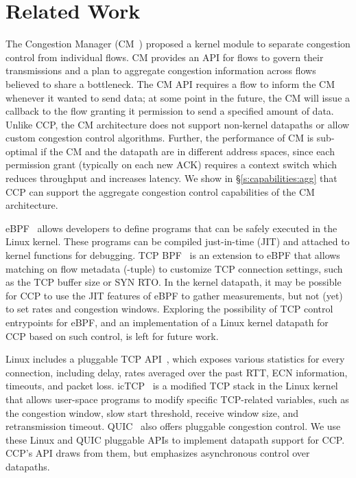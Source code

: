 \section{Related Work}
\label{s:relwork}
The Congestion Manager (CM~\cite{cm}) proposed a kernel module to separate congestion control from individual flows. CM provides an API for flows to govern their transmissions and a plan to aggregate congestion information across flows believed to share a bottleneck. The CM API requires a flow to inform the CM whenever it wanted to send data; at some point in the future, the CM will issue a callback to the flow granting it permission to send a specified amount of data. Unlike CCP, the CM architecture does not support non-kernel datapaths or allow custom congestion control algorithms. Further, the performance of CM is sub-optimal if the CM and the datapath are in different address spaces, since %
each permission grant (typically on each new ACK) requires a context switch which reduces throughput and increases latency. We show in \S\ref{s:capabilities:agg} that CCP can support the aggregate congestion control capabilities of the CM architecture.


eBPF~\cite{ebpf} allows developers to define programs that can be safely executed in the Linux kernel. These programs can be compiled just-in-time (JIT) and attached to kernel functions for debugging. TCP BPF~\cite{tcpbpf} is an extension to eBPF that allows matching on flow metadata (-tuple) to customize TCP connection settings, such as the TCP buffer size or SYN RTO.
In the kernel datapath, it may be possible for CCP to use the JIT features of eBPF to gather measurements, but not (yet) to set rates and congestion windows.
Exploring the possibility of TCP control entrypoints for eBPF, and an implementation of a Linux kernel datapath for CCP based on such control, is left for future work.

Linux includes a pluggable TCP API~\cite{lwn-pluggable-tcp}, which exposes various statistics for every connection, including delay, rates averaged over the past RTT, ECN information, timeouts, and packet loss.
icTCP~\cite{icTCP} is a modified TCP stack in the Linux kernel that allows user-space programs to modify specific TCP-related variables, such as the congestion window, slow start threshold, receive window size, and retransmission timeout. 
QUIC~\cite{quic} also offers pluggable congestion control. 
We use these Linux and QUIC pluggable APIs to implement datapath support for CCP. CCP's API draws from them, but emphasizes asynchronous control over datapaths.

